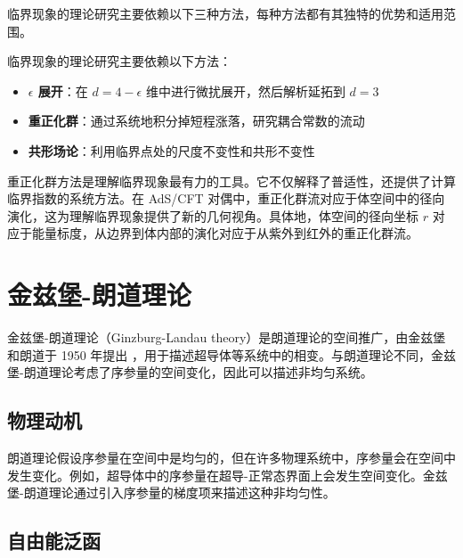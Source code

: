 \begin{note}
临界现象的理论研究主要依赖以下三种方法，每种方法都有其独特的优势和适用范围。
\end{note}

临界现象的理论研究主要依赖以下方法：
\begin{itemize}
    \item \textbf{$\epsilon$ 展开}：在 $d = 4 - \epsilon$ 维中进行微扰展开，然后解析延拓到 $d = 3$
    \item \textbf{重正化群}：通过系统地积分掉短程涨落，研究耦合常数的流动
    \item \textbf{共形场论}：利用临界点处的尺度不变性和共形不变性
\end{itemize}

\begin{remark}
重正化群方法是理解临界现象最有力的工具。它不仅解释了普适性，还提供了计算临界指数的系统方法。在 AdS/CFT 对偶中，重正化群流对应于体空间中的径向演化，这为理解临界现象提供了新的几何视角。具体地，体空间的径向坐标 $r$ 对应于能量标度，从边界到体内部的演化对应于从紫外到红外的重正化群流。
\end{remark}

\section{金兹堡-朗道理论}

金兹堡-朗道理论（Ginzburg-Landau theory）是朗道理论的空间推广，由金兹堡和朗道于 1950 年提出 \cite{Ginzburg1950}，用于描述超导体等系统中的相变。与朗道理论不同，金兹堡-朗道理论考虑了序参量的空间变化，因此可以描述非均匀系统。

\subsection{物理动机}

\begin{note}
朗道理论假设序参量在空间中是均匀的，但在许多物理系统中，序参量会在空间中发生变化。例如，超导体中的序参量在超导-正常态界面上会发生空间变化。金兹堡-朗道理论通过引入序参量的梯度项来描述这种非均匀性。
\end{note}

\subsection{自由能泛函}

